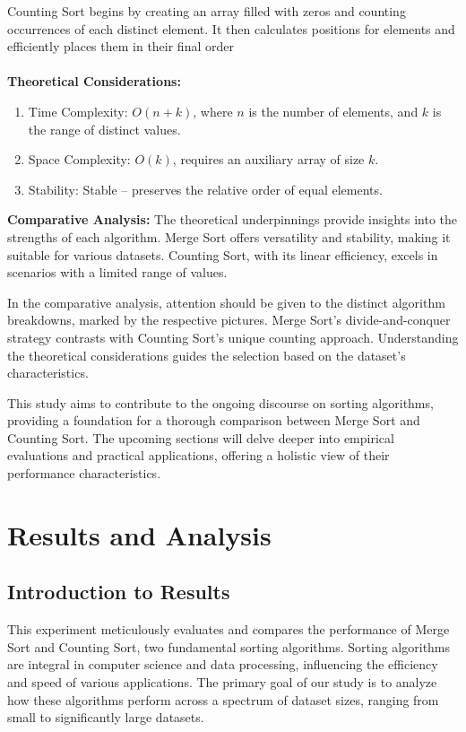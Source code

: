 \documentclass[12pt,twocolumn]{article}
\begin{document}
Counting Sort begins by creating an array filled with zeros and counting occurrences of each distinct element. It then calculates positions for elements and efficiently places them in their final order
\cite{garg2017practical}
\\
\\
\textbf{Theoretical Considerations:}

\begin{enumerate}
  \item Time Complexity: \( O(n + k) \), where \( n \) is the number of elements, and \( k \) is the range of distinct values.
  \item Space Complexity: \( O(k) \), requires an auxiliary array of size \( k \).
  \item Stability: Stable – preserves the relative order of equal elements.
\end{enumerate}

\textbf{Comparative Analysis:}
The theoretical underpinnings provide insights into the strengths of each algorithm. Merge Sort offers versatility and stability, making it suitable for various datasets. Counting Sort, with its linear efficiency, excels in scenarios with a limited range of values.

In the comparative analysis, attention should be given to the distinct algorithm breakdowns, marked by the respective pictures. Merge Sort's divide-and-conquer strategy contrasts with Counting Sort's unique counting approach. Understanding the theoretical considerations guides the selection based on the dataset's characteristics.

This study aims to contribute to the ongoing discourse on sorting algorithms, providing a foundation for a thorough comparison between Merge Sort and Counting Sort. The upcoming sections will delve deeper into empirical evaluations and practical applications, offering a holistic view of their performance characteristics.

\section{Results and Analysis}
\subsection{Introduction to Results}
This experiment meticulously evaluates and compares the performance of Merge Sort and Counting Sort, two fundamental sorting algorithms. Sorting algorithms are integral in computer science and data processing, influencing the efficiency and speed of various applications. The primary goal of our study is to analyze how these algorithms perform across a spectrum of dataset sizes, ranging from small to significantly large datasets.
\end{document}
